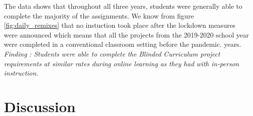 \documentclass[sigconf,manuscript,review,anonymous]{acmart} %
\def\ts{TIPP\&SEE}
\newcommand{\Scratchencore}[0]{Blinded Curriculum}
\begin{document}
The data shows that throughout all three years, students were generally able to complete
the majority of the assignments. We know from figure \ref{fig:daily_remixes} that
no instuction took place after the lockdown measures were announced which means
that all the projects from the 2019-2020 school year were completed in a conventional
classroom setting before the pandemic. 
years.
\\
\textit{Finding : Students were able to complete the \Scratchencore{}
project requirements at similar rates during online learning as they had with in-person instruction.} 

\section{Discussion}


\end{document}
